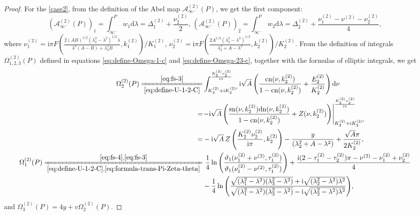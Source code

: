 \documentclass[11pt,reqno]{amsart}
\newcommand{\ii}{\mathrm{i}}
\newcommand{\sn}{\mathrm{sn}}
\newcommand{\cn}{\mathrm{cn}}
\newcommand{\dn}{\mathrm{dn}}
\newcommand{\dd}{\mathrm{d}}
\numberwithin{equation}{section}
\begin{document}
\begin{proof}
	For the \ref{case2}, from the definition of the Abel map $\mathcal{A}_{\infty^-}^{(2)}(P)$,
	we get the first component:
	\begin{equation}\label{eq:define-AP-C}
			\!\!\!\! (\mathcal{A}^{(2)}_{\infty^-}(P))_{1}
			=\int_{\infty^{-}}^{P}w_{1} \dd \lambda
			= \Delta_1^{(2)}+ \frac{ \nu^{(2)} _2}{2}, \,
			(\mathcal{A}^{(2)}_{\infty^-}(P))_{2}
			=\int_{\infty^{-}}^{P}w_{2} \dd \lambda
			= \Delta_2^{(2)}+ \frac{ \nu^{(2)}_1- \nu^{(2)}- \nu^{(2)}_2}{4}, 
	\end{equation}
	where $\nu^{(2)}_1 =\ii \pi F\left(\frac{2(AB)^{1/2}(\lambda_2^2-\lambda^2)^{1/2}\lambda}{\lambda^2(A-B)+\lambda_2^2B},  k^{(2)}_1\right)/K^{(2)}_1$,
	 $ \nu^{(2)}_2=\ii \pi F\left(\frac{2A^{1/2}(\lambda_2^2-\lambda^2)^{1/2}}{\lambda_2^2+A-\lambda^2},  k^{(2)}_2\right)/ K^{(2)}_2.$
	From the definition of integrals $\Omega_{1,2,3}^{(2)}(P)$ defined in equations \eqref{eq:define-Omega-1-c} and \eqref{eq:define-Omega-23-c}, together with the formulas of elliptic integrals, we get 
	\begin{equation}\label{eq:define-Omega-123-C}
		\begin{split}
			\Omega_2^{(2)}(P) \xlongequal[\eqref{eq:define-U-1-2-C}]{\eqref{eq:fs-3}}& \int_{  K^{(2)}_2+\ii   K^{(2)\prime}_2}^{\frac{  K^{(2)}_2 \nu^{(2)} _2}{\ii \pi}} \ii \sqrt{A} \left(\frac{\cn(\nu,  k^{(2)}_2)}{1-\cn(\nu,  k^{(2)}_2)} +\frac{ E^{(2)}_2}{  K^{(2)}_2}\right)\dd \nu
			 \\=& \! \left. -\ii \sqrt{A} \left(\frac{\sn(\nu,  k^{(2)}_2)\dn(\nu,  k^{(2)}_2)}{1-\cn(\nu,  k^{(2)}_2)} +Z(\nu,  k^{(2)}_2)\right)\right|_{  K^{(2)}_2+\ii   K^{(2)\prime}_2}^{\frac{  K^{(2)}_2 \nu^{(2)} _2}{\ii \pi}}\\
			=& - \ii \sqrt{A}\, Z\left(\frac{  K^{(2)}_2 \nu^{(2)} _2}{\ii \pi },  k^{(2)}_2\right)- \frac{y}{\left( \lambda^2_2+A-\lambda^2\right)} +\frac{ \sqrt{A} \pi }{2  K^{(2)}_2},\\
			\Omega_1^{(2)}(P)\xlongequal[\eqref{eq:define-U-1-2-C},\eqref{eq:formula-trans-Pi-Zeta-theta}]{\eqref{eq:fs-4},\eqref{eq:fs-3}}&\ \frac{1}{4}\ln\left(\frac{\vartheta_1( \nu^{(2)} _1+ \nu^{(2)} ,\tau_1^{(2)})}{\vartheta_1( \nu^{(2)} _1- \nu^{(2)} ,\tau_1^{(2)})}\right)
			+\frac{\ii (2- \tau^{(2)} _1- \tau^{(2)} _2)\pi- \nu^{(2)} - \nu^{(2)} _1+ \nu^{(2)} _2}{4}\\&-\frac{1}{4}\ln\left(\frac{\sqrt{(\lambda_1^2-\lambda^2)(\lambda_3^2-\lambda^2)}+\ii \sqrt{(\lambda_2^2-\lambda^2)\lambda^2}}{\sqrt{(\lambda_1^2-\lambda^2)(\lambda_3^2-\lambda^2)}-\ii \sqrt{(\lambda_2^2-\lambda^2)\lambda^2}}\right) \! ,
			\\
		\end{split}
	\end{equation}
	and $\Omega_3^{(2)}(P) = 4y + v \Omega_2^{(2)}(P)$.
\end{proof}
\end{document}
